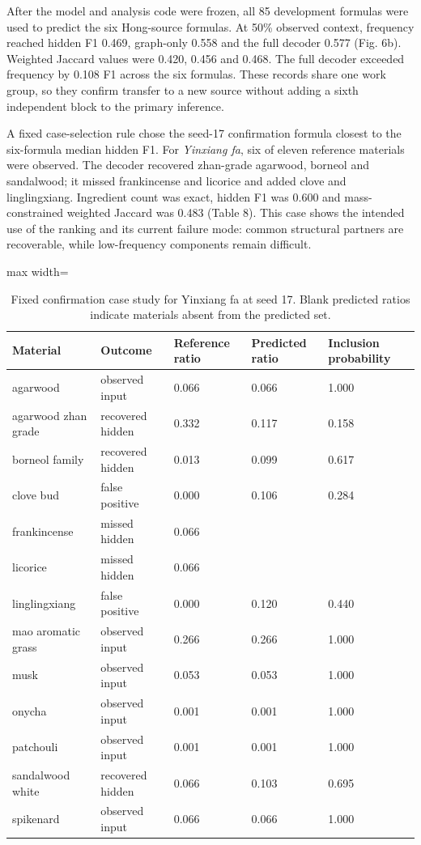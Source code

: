 \documentclass[11pt]{article}
\begin{document}
After the model and analysis code were frozen, all 85 development formulas were used to predict the six Hong-source formulas. At 50\% observed context, frequency reached hidden F1 0.469, graph-only 0.558 and the full decoder 0.577 (Fig. 6b). Weighted Jaccard values were 0.420, 0.456 and 0.468. The full decoder exceeded frequency by 0.108 F1 across the six formulas. These records share one work group, so they confirm transfer to a new source without adding a sixth independent block to the primary inference.

A fixed case-selection rule chose the seed-17 confirmation formula closest to the six-formula median hidden F1. For \emph{Yinxiang fa}, six of eleven reference materials were observed. The decoder recovered zhan-grade agarwood, borneol and sandalwood; it missed frankincense and licorice and added clove and linglingxiang. Ingredient count was exact, hidden F1 was 0.600 and mass-constrained weighted Jaccard was 0.483 (Table 8). This case shows the intended use of the ranking and its current failure mode: common structural partners are recoverable, while low-frequency components remain difficult.

\begin{table}[htbp]
\centering
\small
\caption{Fixed confirmation case study for Yinxiang fa at seed 17. Blank predicted ratios indicate materials absent from the predicted set.}
\label{tab:8}
\begin{adjustbox}{max width=\linewidth}
\begin{tabular}{@{}lllll@{}}
\toprule
\textbf{Material} & \textbf{Outcome} & \textbf{Reference ratio} & \textbf{Predicted ratio} & \textbf{Inclusion probability} \\
\midrule
agarwood & observed input & 0.066 & 0.066 & 1.000 \\
agarwood zhan grade & recovered hidden & 0.332 & 0.117 & 0.158 \\
borneol family & recovered hidden & 0.013 & 0.099 & 0.617 \\
clove bud & false positive & 0.000 & 0.106 & 0.284 \\
frankincense & missed hidden & 0.066 &  &  \\
licorice & missed hidden & 0.066 &  &  \\
linglingxiang & false positive & 0.000 & 0.120 & 0.440 \\
mao aromatic grass & observed input & 0.266 & 0.266 & 1.000 \\
musk & observed input & 0.053 & 0.053 & 1.000 \\
onycha & observed input & 0.001 & 0.001 & 1.000 \\
patchouli & observed input & 0.001 & 0.001 & 1.000 \\
sandalwood white & recovered hidden & 0.066 & 0.103 & 0.695 \\
spikenard & observed input & 0.066 & 0.066 & 1.000 \\
\bottomrule
\end{tabular}
\end{adjustbox}
\end{table}
\end{document}
